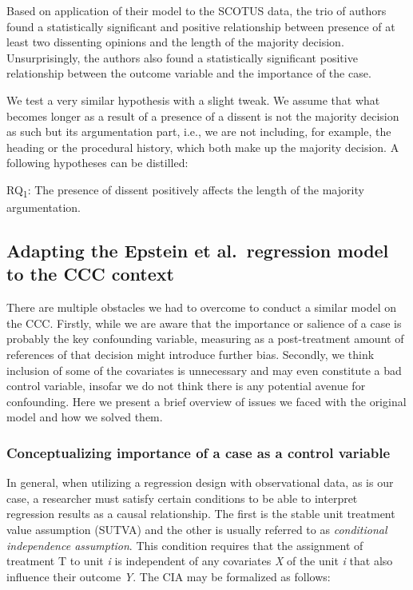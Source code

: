 \documentclass[
  11pt,
]{article}
\begin{document}
Based on application of their model to the SCOTUS data, the trio of
authors found a statistically significant and positive relationship
between presence of at least two dissenting opinions and the length of
the majority decision. Unsurprisingly, the authors also found a
statistically significant positive relationship between the outcome
variable and the importance of the case.

We test a very similar hypothesis with a slight tweak. We assume that
what becomes longer as a result of a presence of a dissent is not the
majority decision as such but its argumentation part, i.e., we are not
including, for example, the heading or the procedural history, which
both make up the majority decision. A following hypotheses can be
distilled:

RQ\textsubscript{1}: The presence of dissent positively affects the
length of the majority argumentation.

\hypertarget{adapting-the-epstein-et-al.-regression-model-to-the-ccc-context}{%
\subsection{Adapting the Epstein et al.~regression model to the CCC
context}\label{adapting-the-epstein-et-al.-regression-model-to-the-ccc-context}}

There are multiple obstacles we had to overcome to conduct a similar
model on the CCC. Firstly, while we are aware that the importance or
salience of a case is probably the key confounding variable, measuring
as a post-treatment amount of references of that decision might
introduce further bias. Secondly, we think inclusion of some of the
covariates is unnecessary and may even constitute a bad control
variable, insofar we do not think there is any potential avenue for
confounding. Here we present a brief overview of issues we faced with
the original model and how we solved them.

\hypertarget{conceptualizing-importance-of-a-case-as-a-control-variable}{%
\subsubsection{Conceptualizing importance of a case as a control
variable}\label{conceptualizing-importance-of-a-case-as-a-control-variable}}

In general, when utilizing a regression design with observational data,
as is our case, a researcher must satisfy certain conditions to be able
to interpret regression results as a causal relationship. The first is
the stable unit treatment value assumption (SUTVA) and the other is
usually referred to as \emph{conditional independence assumption}. This
condition requires that the assignment of treatment T to unit \emph{i}
is independent of any covariates \emph{X} of the unit \emph{i} that also
influence their outcome \emph{Y}. The CIA may be formalized as follows:
\end{document}
